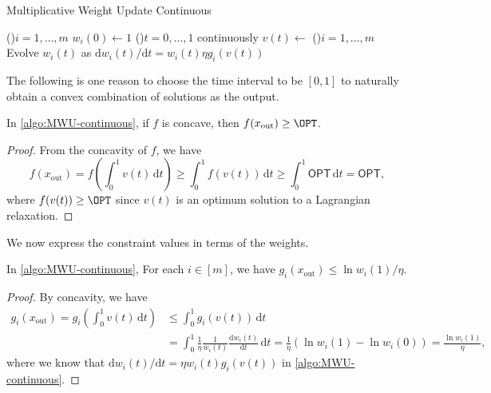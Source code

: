 \begin{algorithm}[H]\label{algo:MWU-continuous}
	\DontPrintSemicolon{}
	\caption{Multiplicative Weight Update Continuous}
	\BlankLine

	\For(){\(i = 1, \dots , m\)}{
		\(w_i(0) \gets 1\)\;
	}
	\;
	\While(){\(t = 0, \dots , 1\) continuously}{
	\(v(t) \gets\)\;
	\For(){\(i = 1, \dots , m\)}{
		Evolve \(w_i(t)\) as \(\mathrm{d} w_i(t) / \mathrm{d} t = w_i(t) \eta g_i(v(t))\)\;
	}
	}
	\;
\end{algorithm}

The following is one reason to choose the time interval to be \([0, 1]\) to naturally obtain a convex combination of solutions as the output.

\begin{lemma}\label{lma:MWU-continuous-OPT}
	In \autoref{algo:MWU-continuous}, if \(f\) is concave, then \(f(x_{\text{out} }) \geq \OPT\).
\end{lemma}
\begin{proof}
	From the concavity of \(f\), we have
	\[
		f(x_{\text{out} })
		= f \left( \int_{0}^{1} v(t) \,\mathrm{d}t \right)
		\geq \int_{0}^{1} f(v(t)) \,\mathrm{d}t
		\geq \int_{0}^{1} \mathsf{OPT} \,\mathrm{d}t
		= \mathsf{OPT},
	\]
	where \(f(v(t)) \geq \OPT\) since \(v(t)\) is an optimum solution to a Lagrangian relaxation.
\end{proof}

We now express the constraint values in terms of the weights.

\begin{lemma}\label{lma:MWU-continuous-constraint}
	In \autoref{algo:MWU-continuous}, For each \(i \in [m]\), we have \(g_i(x_{\text{out} }) \leq \ln w_i(1) / \eta \).
\end{lemma}
\begin{proof}
	By concavity, we have
	\[
		\begin{split}
			g_i(x_{\text{out} })
			= g_i \left( \int_{0}^{1} v(t) \,\mathrm{d}t \right)
			 & \leq \int_{0}^{1} g_i(v(t)) \,\mathrm{d}t                                                           \\
			 & = \int_{0}^{1} \frac{1}{\eta } \frac{1}{w_i(t)} \frac{\mathrm{d}w_i (t)}{\mathrm{d}t} \,\mathrm{d}t
			= \frac{1}{\eta } \left( \ln w_i(1) - \ln w_i(0) \right)
			= \frac{\ln w_i(1)}{\eta },
		\end{split}
	\]
	where we know that \(\mathrm{d} w_i(t) / \mathrm{d} t = \eta w_i(t) g_i(v(t))\) in \autoref{algo:MWU-continuous}.
\end{proof}

